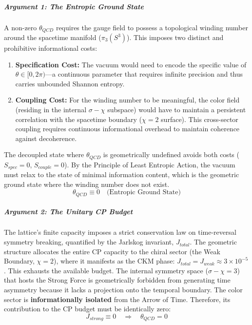 \subparagraph{Argument 1: The Entropic Ground State}
A non-zero $\theta_{QCD}$ requires the gauge field to possess a topological winding number around the spacetime manifold ($\pi_3(S^3)$). This imposes two distinct and prohibitive informational costs:
\begin{enumerate}
    \item \textbf{Specification Cost:} The vacuum would need to encode the specific value of $\theta \in [0, 2\pi)$—a continuous parameter that requires infinite precision and thus carries unbounded Shannon entropy.
    \item \textbf{Coupling Cost:} For the winding number to be meaningful, the color field (residing in the internal $\sigma-\chi$ subspace) would have to maintain a persistent correlation with the spacetime boundary ($\chi=2$ surface). This cross-sector coupling requires continuous informational overhead to maintain coherence against decoherence.
\end{enumerate}
The decoupled state where $\theta_{QCD}$ is geometrically undefined avoids both costs ($S_{spec}=0$, $S_{couple}=0$). By the Principle of Least Entropic Action, the vacuum must relax to the state of minimal information content, which is the geometric ground state where the winding number does not exist.
\begin{equation}
    \theta_{QCD} \equiv 0 \quad \text{(Entropic Ground State)}
\end{equation}

\subparagraph{Argument 2: The Unitary CP Budget}
The lattice's finite capacity imposes a strict conservation law on time-reversal symmetry breaking, quantified by the Jarlskog invariant, $J_{total}$. The geometric structure allocates the entire CP capacity to the chiral sector (the Weak Boundary, $\chi=2$), where it manifests as the CKM phase: $J_{total} = J_{weak} \approx 3 \times 10^{-5}$. This exhausts the available budget. The internal symmetry space ($\sigma-\chi=3$) that hosts the Strong Force is geometrically forbidden from generating time asymmetry because it lacks a projection onto the temporal boundary. The color sector is \textbf{informationally isolated} from the Arrow of Time. Therefore, its contribution to the CP budget must be identically zero:
\begin{equation}
    J_{strong} \equiv 0 \quad \Rightarrow \quad \theta_{QCD} = 0
\end{equation}

